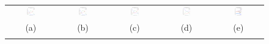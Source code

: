 \begin{figure}[t]
\centering
\begin{tabular}{@{}c c c c c@{}} %
\includegraphics[width=0.18\textwidth]{figs/synthetic/syn_lines_g2d_scales_0} &
\includegraphics[width=0.18\textwidth]{figs/synthetic/syn_lines_g2d_scales_1} &
\includegraphics[width=0.18\textwidth]{figs/synthetic/syn_lines_g2d_scales_2} &
\includegraphics[width=0.18\textwidth]{figs/synthetic/syn_lines_g2d_scales_3} &
\includegraphics[width=0.18\textwidth]{figs/retina/ret_vessels_g2d_scales} \\
(a) & (b) & (c) & (d) & (e)\\
\noalign{\smallskip}


\end{tabular}
\end{figure}
